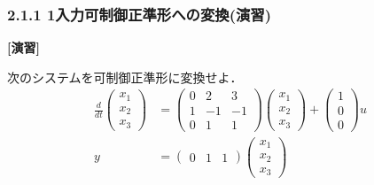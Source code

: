 \begin{frame}[t]
\frametitle{2.1.1 1入力可制御正準形への変換(演習)}

\noindent
{\bf[演習]}\nopagebreak

次のシステムを可制御正準形に変換せよ．
\begin{align}
 \frac{d}{dt}
  \left(\begin{array}{c}
     {x}_1 \\
	 {x}_2 \\
	 {x}_3 
	\end{array}\right)
  &=
  \left(\begin{array}{ccc}
     0      & 2      & 3     \\
     1      & -1     & -1    \\
	 0      & 1      & 1     
	\end{array}\right)
  \left(\begin{array}{c}
     {x}_1 \\
	 {x}_2 \\
	 {x}_3 
	\end{array}\right)
  +
  \left(\begin{array}{c}
     1 \\
	 0 \\
	 0 
	\end{array}\right)
  u 
\nonumber \\
	y &= 
  \left(\begin{array}{ccc}
     0      & 1      & 1 
	\end{array}\right)
  \left(\begin{array}{c}
     {x}_1 \\
	 {x}_2 \\
	 {x}_3 
	\end{array}\right)
\nonumber 
\end{align}
\end{frame}

